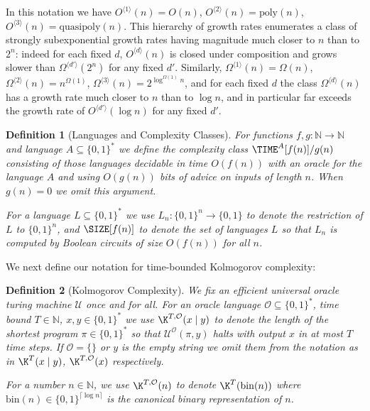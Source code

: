 \documentclass[11pt]{article}
\newtheorem{definition}{Definition}
\newcommand{\B}{\{0,1\}}
\newcommand{\od}[1]{O^{\langle #1 \rangle}}
\newcommand{\omd}[1]{\Omega^{\langle #1 \rangle}}
\renewcommand{\poly}{\mathrm{poly}}
\begin{document}
In this notation we have $\od{1}(n) = O(n)$, $\od{2}(n) = \poly(n)$, $\od{3}(n) = \mathrm{quasipoly}(n)$. This hierarchy of growth rates enumerates a class of strongly subexponential growth rates having magnitude much closer to $n$ than to $2^n$: indeed for each fixed $d$, $\od{d}(n)$ is closed under composition and grows slower than $\omd{d'}(2^n)$ for any fixed $d'$.
Similarly, $\omd{1}(n) = \Omega(n)$, $\omd{2}(n) = n^{\Omega(1)}$, $\omd{3}(n) = 2^{\log^{\Omega(1)}n}$, and for each fixed $d$ the class $\omd{d}(n)$ has a growth rate much closer to $n$ than to $\log n$, and in particular far exceeds the growth rate of $\od{d'}(\log n)$ for any fixed $d'$.



\begin{definition}[Languages and Complexity Classes]


For functions $f,g:\mathbb{N} \to \mathbb{N}$ and language $A \subseteq \B^*$ we define the complexity class $\TIME^A[f(n)]/g(n)$ consisting of those languages decidable in time $O(f(n))$ with an oracle for the language $A$ and using $O(g(n))$ bits of advice on inputs of length $n$. When $g(n)=0$ we omit this argument.

For a language $L \subseteq \B^*$ we use $L_n: \B^n \to \B$ to denote the restriction of $L$ to $\B^n$, and $\SIZE[f(n)]$ to denote the set of languages $L$ so that $L_n$ is computed by Boolean circuits of size $O(f(n))$ for all $n$.
\end{definition}

We next define our notation for time-bounded Kolmogorov complexity:

\begin{definition}[Kolmogorov Complexity]
We fix an efficient universal oracle turing machine $\mathcal{U}$ once and for all. For an oracle language $\mathcal{O} \subseteq \B^*$, time bound $T\in \mathbb{N}$, $x,y \in \B^*$ we use $\K^{T,\mathcal{O}}(x \mid y)$ to denote the length of the shortest program $\pi \in \B^*$ so that $\mathcal{U}^\mathcal{O}(\pi,y)$ halts with output $x$ in at most $T$ time steps. If $\mathcal{O} = \{\}$ or $y$ is the empty string we omit them from the notation as in $\K^{T}(x \mid y)$, $\K^{T,\mathcal{O}}(x)$ respectively.

For a number $n \in \mathbb{N}$, we use $\K^{T,\mathcal{O}}(n)$ to denote $\K^T(\mathrm{bin}(n))$ where $\mathrm{bin}(n) \in \B^{\lceil \log n \rceil}$ is the canonical binary representation of $n$. 
\end{definition}
\end{document}
